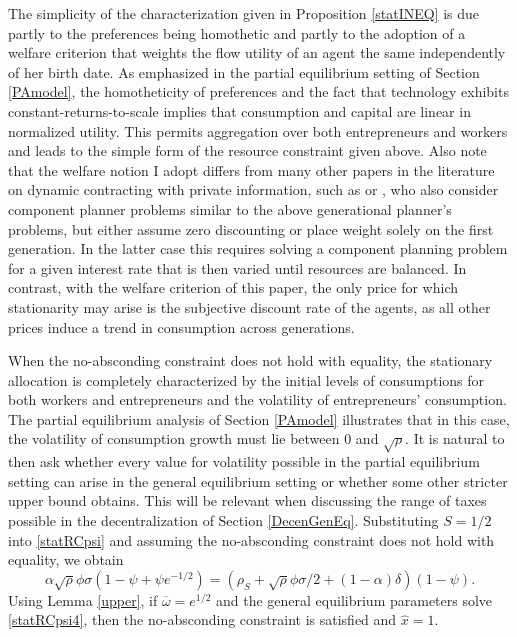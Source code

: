 \documentclass[11pt]{article}
\theoremstyle{plain}
\theoremstyle{definition} %
\begin{document}
The simplicity of the characterization given in Proposition \ref{statINEQ} is due partly to the preferences being homothetic and partly to the adoption of a welfare criterion that weights the flow utility of an agent the same independently of her birth date. As emphasized in the partial equilibrium setting of Section \ref{PAmodel}, the homotheticity of preferences and the fact that technology exhibits constant-returns-to-scale implies that consumption and capital are linear in normalized utility. This permits aggregation over both entrepreneurs and workers and leads to the simple form of the resource constraint given above. Also note that the welfare notion I adopt differs from many other papers in the literature on dynamic contracting with private information, such as \cite{atkeson_efficient_1992} or \cite{phelan_incentives_1994}, who also consider component planner problems similar to the above generational planner's problems, but either assume zero discounting or place weight solely on the first generation. In the latter case this requires solving a component planning problem for a given interest rate that is then varied until resources are balanced. In contrast, with the welfare criterion of this paper, the only price for which stationarity may arise is the subjective discount rate of the agents, as all other prices induce a trend in consumption across generations. 

When the no-absconding constraint does not hold with equality, the stationary allocation is completely characterized by the initial levels of consumptions for both workers and entrepreneurs and the volatility of entrepreneurs' consumption. The partial equilibrium analysis of Section \ref{PAmodel} illustrates that in this case, the volatility of consumption growth must lie between 0 and $\sqrt{\rho}$. It is natural to then ask whether every value for volatility possible in the partial equilibrium setting can arise in the general equilibrium setting or whether some other stricter upper bound obtains. This will be relevant when discussing the range of taxes possible in the decentralization of Section \ref{DecenGenEq}. Substituting $S = 1/2$ into \eqref{statRCpsi} and assuming the no-absconding constraint does not hold with equality, we obtain
\begin{equation}
\alpha \sqrt{\rho}\phi \sigma(1 - \psi + \psi e^{-1/2}) = {\left(\rho_S + \sqrt{\rho}\phi \sigma/2 + (1-\alpha)\delta \right)}(1-\psi).
\label{statRCpsi4}
\end{equation}
Using Lemma \ref{upper}, if $\overline{\omega} = e^{1/2}$ and the general equilibrium parameters solve \eqref{statRCpsi4}, then the no-absconding constraint is satisfied and $\hat{x} = 1$. 
\end{document}
